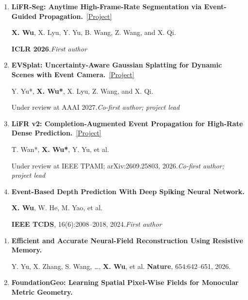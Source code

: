 \documentclass[a4paper]{article}
\newcommand{\pubgroup}[1]{%
  \par\vspace{2.0pt}{\color{cvblue}\fontsize{9.4}{10.4}\selectfont\bfseries #1}\par
}
\begin{document}
{\begin{enumerate}[leftmargin=1.6em,labelsep=0.38em,itemsep=0.4pt,topsep=1.3pt,parsep=0pt,partopsep=0pt]
\textbf{X. Wu}, Y. Yu, X. Lyu, et al.\par
\textbf{NeurIPS 2025} \textcolor{cvred}{\textbf{\textperiodcentered\ Spotlight}}.\hfill\textcolor{cvblue}{\textit{First author}}
\item \textbf{LiFR-Seg: Anytime High-Frame-Rate Segmentation via Event-Guided Propagation.}~\href{https://candy-crusher.github.io/xiaoshanwu.github.io/projects/lifr-seg/}{\textcolor{cvblue}{[Project]}}\par
\textbf{X. Wu}, X. Lyu, Y. Yu, B. Wang, Z. Wang, and X. Qi.\par
\textbf{ICLR 2026}.\hfill\textcolor{cvblue}{\textit{First author}}
\item \textbf{EVSplat: Uncertainty-Aware Gaussian Splatting for Dynamic Scenes with Event Camera.}~\href{https://candy-crusher.github.io/xiaoshanwu.github.io/projects/evsplat/}{\textcolor{cvblue}{[Project]}}\par
Y. Yu*, \textbf{X. Wu*\textdagger}, X. Lyu, Z. Wang, and X. Qi.\par
Under review at AAAI 2027.\hfill\textcolor{cvblue}{\textit{Co-first author; project lead}}
\item \textbf{LiFR v2: Completion-Augmented Event Propagation for High-Rate Dense Prediction.}~\href{https://candy-crusher.github.io/xiaoshanwu.github.io/projects/lifr-v2/}{\textcolor{cvblue}{[Project]}}\par
T. Wan*, \textbf{X. Wu*\textdagger}, Y. Yu, et al.\par
Under review at IEEE TPAMI; arXiv:2609.25803, 2026.\hfill\textcolor{cvblue}{\textit{Co-first author; project lead}}
\item \textbf{Event-Based Depth Prediction With Deep Spiking Neural Network.}\par
\textbf{X. Wu}, W. He, M. Yao, et al.\par
\textbf{IEEE TCDS}, 16(6):2008--2018, 2024.\hfill\textcolor{cvblue}{\textit{First author}}
\end{enumerate}
\pubgroup{Collaborative Work}
\begin{enumerate}[resume,leftmargin=1.6em,labelsep=0.38em,itemsep=0.4pt,topsep=1.3pt,parsep=0pt,partopsep=0pt]
\item \textbf{Efficient and Accurate Neural-Field Reconstruction Using Resistive Memory.}\par
Y. Yu, X. Zhang, S. Wang, \ldots, \textbf{X. Wu}, et al. \hfill \textbf{Nature}, 654:642--651, 2026.
\item \textbf{FoundationGeo: Learning Spatial Pixel-Wise Fields for Monocular Metric Geometry.}\par

\end{enumerate}}
\end{document}
